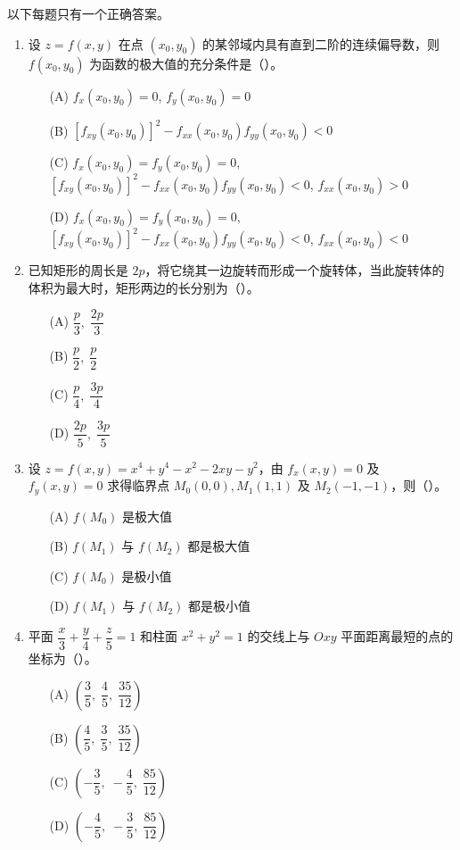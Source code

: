 \documentclass[lang=cn,11pt]{elegantbook}
\begin{document}
\begin{exercise}
以下每题只有一个正确答案。
\begin{enumerate}
  \item 设 $z=f(x,y)$ 在点 $(x_0,y_0)$ 的某邻域内具有直到二阶的连续偏导数，则 $f(x_0,y_0)$ 为函数的极大值的充分条件是（\qquad）。
    \begin{enumerate}
      \item[(A)] $f_x(x_0,y_0)=0$, $f_y(x_0,y_0)=0$
      \item[(B)] $[f_{xy}(x_0,y_0)]^2-f_{xx}(x_0,y_0)f_{yy}(x_0,y_0)<0$
      \item[(C)] $f_x(x_0,y_0)=f_y(x_0,y_0)=0$, $[f_{xy}(x_0,y_0)]^2-f_{xx}(x_0,y_0)f_{yy}(x_0,y_0)<0$, $f_{xx}(x_0,y_0)>0$
      \item[(D)] $f_x(x_0,y_0)=f_y(x_0,y_0)=0$, $[f_{xy}(x_0,y_0)]^2-f_{xx}(x_0,y_0)f_{yy}(x_0,y_0)<0$, $f_{xx}(x_0,y_0)<0$
    \end{enumerate}

  \item 已知矩形的周长是 $2p$，将它绕其一边旋转而形成一个旋转体，当此旋转体的体积为最大时，矩形两边的长分别为（\qquad）。
    \begin{enumerate}
      \item[(A)] $\dfrac{p}{3},\;\dfrac{2p}{3}$
      \item[(B)] $\dfrac{p}{2},\;\dfrac{p}{2}$
      \item[(C)] $\dfrac{p}{4},\;\dfrac{3p}{4}$
      \item[(D)] $\dfrac{2p}{5},\;\dfrac{3p}{5}$
    \end{enumerate}

  \item 设 $z=f(x,y)=x^4+y^4-x^2-2xy-y^2$，由 $f_x(x,y)=0$ 及 $f_y(x,y)=0$ 求得临界点 $M_0(0,0), M_1(1,1)$ 及 $M_2(-1,-1)$，则（\qquad）。
    \begin{enumerate}
      \item[(A)] $f(M_0)$ 是极大值
      \item[(B)] $f(M_1)$ 与 $f(M_2)$ 都是极大值
      \item[(C)] $f(M_0)$ 是极小值
      \item[(D)] $f(M_1)$ 与 $f(M_2)$ 都是极小值
    \end{enumerate}

  \item 平面 $\dfrac{x}{3}+\dfrac{y}{4}+\dfrac{z}{5}=1$ 和柱面 $x^2+y^2=1$ 的交线上与 $Oxy$ 平面距离最短的点的坐标为（\qquad）。
    \begin{enumerate}
      \item[(A)] $\left(\dfrac{3}{5},\;\dfrac{4}{5},\;\dfrac{35}{12}\right)$
      \item[(B)] $\left(\dfrac{4}{5},\;\dfrac{3}{5},\;\dfrac{35}{12}\right)$
      \item[(C)] $\left(-\dfrac{3}{5},\;-\dfrac{4}{5},\;\dfrac{85}{12}\right)$
      \item[(D)] $\left(-\dfrac{4}{5},\;-\dfrac{3}{5},\;\dfrac{85}{12}\right)$
    \end{enumerate}


\end{enumerate}
\end{exercise}
\end{document}
